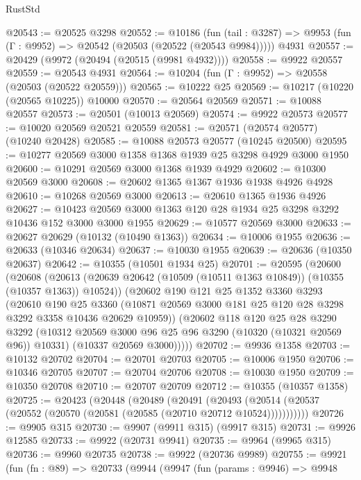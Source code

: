 \begin{lexlean}{RustStd}
\begin{coremodule}
@20543 := @20525 @3298
@20552 := @10186
    (fun (tail : @3287) => @9953 (fun (Γ : @9952) => @20542 (@20503 (@20522 (@20543 @9984)))))
    @4931
@20557 := @20429 (@9972 (@20494 (@20515 (@9981 @4932))))
@20558 := @9922 @20557
@20559 := @20543 @4931
@20564 := @10204 (fun (Γ : @9952) => @20558 (@20503 (@20522 @20559)))
@20565 := @10222 @25
@20569 := @10217 (@10220 (@20565 @10225)) @10000
@20570 := @20564 @20569
@20571 := @10088 @20557
@20573 := @20501 (@10013 @20569)
@20574 := @9922 @20573
@20577 := @10020 @20569 @20521 @20559
@20581 := @20571 (@20574 @20577) (@10240 @20428)
@20585 := @10088 @20573 @20577 (@10245 @20500)
@20595 := @10277 @20569 @3000 @1358 @1368 @1939 @25 @3298 @4929 @3000 @1950
@20600 := @10291 @20569 @3000 @1368 @1939 @4929
@20602 := @10300 @20569 @3000
@20608 := @20602 @1365 @1367 @1936 @1938 @4926 @4928
@20610 := @10268 @20569 @3000
@20613 := @20610 @1365 @1936 @4926
@20627 := @10423 @20569 @3000 @1363 @120 @28 @1934 @25 @3298 @3292 @10436 @152 @3000 @3000 @1955
@20629 := @10577 @20569 @3000
@20633 := @20627 @20629 (@10132 (@10490 @1363))
@20634 := @10006 @1955
@20636 := @20633 (@10346 @20634)
@20637 := @10030 @1955
@20639 := @20636 (@10350 @20637)
@20642 := @10355 (@10501 @1934 @25)
@20701 := @20595
    (@20600
      (@20608
        (@20613 (@20639 @20642 (@10509 (@10511 @1363 @10849)) (@10355 (@10357 @1363)) @10524))
        (@20602
          @190
          @121
          @25
          @1352
          @3360
          @3293
          (@20610
            @190
            @25
            @3360
            (@10871 @20569 @3000 @181 @25 @120 @28 @3298 @3292 @3358 @10436 @20629 @10959))
          (@20602
            @118
            @120
            @25
            @28
            @3290
            @3292
            (@10312 @20569 @3000 @96 @25 @96 @3290 (@10320 (@10321 @20569 @96)) @10331)
            (@10337 @20569 @3000)))))
@20702 := @9936 @1358
@20703 := @10132 @20702
@20704 := @20701 @20703
@20705 := @10006 @1950
@20706 := @10346 @20705
@20707 := @20704 @20706
@20708 := @10030 @1950
@20709 := @10350 @20708
@20710 := @20707 @20709
@20712 := @10355 (@10357 @1358)
@20725 := @20423
    (@20448
      (@20489
        (@20491
          (@20493 (@20514 (@20537 (@20552 (@20570 (@20581 (@20585 (@20710 @20712 @10524)))))))))))
@20726 := @9905 @315
@20730 := @9907 (@9911 @315) (@9917 @315)
@20731 := @9926 @12585
@20733 := @9922 (@20731 @9941)
@20735 := @9964 (@9965 @315)
@20736 := @9960 @20735
@20738 := @9922 (@20736 @9989)
@20755 := @9921
    (fun (fn : @89) =>
    @20733
      (@9944
        (@9947
          (fun (params : @9946) =>
          @9948

\end{coremodule}
\end{lexlean}
